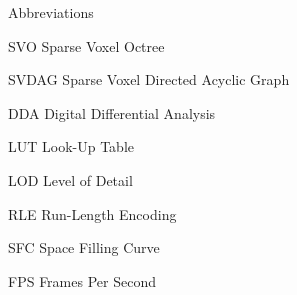 \begin{dictionary}{Abbreviations}
    \item[SVO] Sparse Voxel Octree
    \item[SVDAG] Sparse Voxel Directed Acyclic Graph
    \item[DDA] Digital Differential Analysis
    \item[LUT] Look-Up Table
    \item[LOD] Level of Detail
    \item[RLE] Run-Length Encoding
    \item[SFC] Space Filling Curve
    \item[FPS] Frames Per Second
\end{dictionary}
